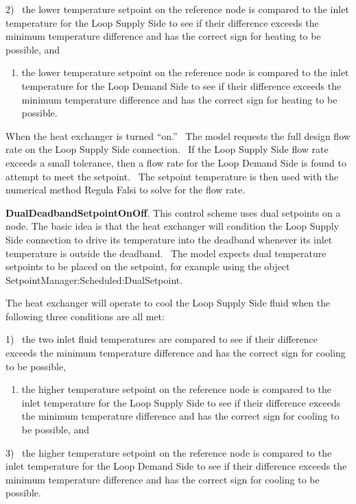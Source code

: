2)~ the lower temperature setpoint on the reference node is compared to the inlet temperature for the Loop Supply Side to see if their difference exceeds the minimum temperature difference and has the correct sign for heating to be possible, and

\begin{enumerate}
\def\labelenumi{\arabic{enumi})}
\setcounter{enumi}{2}
\tightlist
\item
  the lower temperature setpoint on the reference node is compared to the inlet temperature for the Loop Demand Side to see if their difference exceeds the minimum temperature difference and has the correct sign for heating to be possible.
\end{enumerate}

When the heat exchanger is turned ``on.''~ The model requests the full design flow rate on the Loop Supply Side connection.~ If the Loop Supply Side flow rate exceeds a small tolerance, then a flow rate for the Loop Demand Side is found to attempt to meet the setpoint.~ The setpoint temperature is then used with the numerical method Regula Falsi to solve for the flow rate.

\textbf{DualDeadbandSetpointOnOff}. This control scheme uses dual setpoints on a node. The basic idea is that the heat exchanger will condition the Loop Supply Side connection to drive its temperature into the deadband whenever its inlet temperature is outside the deadband.~ The model expects dual temperature setpoints to be placed on the setpoint, for example using the object SetpointManager:Scheduled:DualSetpoint.

The heat exchanger will operate to cool the Loop Supply Side fluid when the following three conditions are all met:

1)~ the two inlet fluid temperatures are compared to see if their difference exceeds the minimum temperature difference and has the correct sign for cooling to be possible,

\begin{enumerate}
\def\labelenumi{\arabic{enumi})}
\setcounter{enumi}{1}
\tightlist
\item
  the higher temperature setpoint on the reference node is compared to the inlet temperature for the Loop Supply Side to see if their difference exceeds the minimum temperature difference and has the correct sign for cooling to be possible, and
\end{enumerate}

3)~ the higher temperature setpoint on the reference node is compared to the inlet temperature for the Loop Demand Side to see if their difference exceeds the minimum temperature difference and has the correct sign for cooling to be possible.

